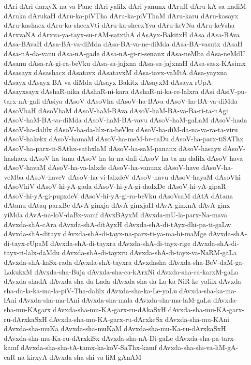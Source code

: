 {dAri
dAri-darxyX-na-va-Pane
dAri-yalilx
dAri-yanunx
dAruH
dAru-kA-sa-nadiM
dAruka
dArukaH
dAru-ka-piVTha
dAru-ka-piVThaM
dAru-karu
dAru-kasayx
dAru-kashacx
dAru-ka-shecxVti
dAru-ka-shecxYva
dAru-keVNa
dAru-keVsha
dArxvaNA
dArxva-ya-tayx-su-rAM-satxthA
dAsAyx-BakitxH
dAsa
dAsa-BAva
dAsa-BAvaH
dAsa-BA-va-diMda
dAsa-BA-va-ne-diMda
dAsa-BA-vasutx
dAsaH
dAsa-nA-da-vanu
dAsa-nA-gade
dAsa-nA-gi-ri-senanx
dAsa-neMba
dAsa-neMdU
dAsanu
dAsa-rA-gi-ra-beVku
dAsa-sa-jajxna
dAsa-sa-jajxnaH
dAsa-sasx-KAsimx
dAsasayx
dAsashacx
dAsatavx
dAsatavxM
dAsa-tavx-vaMtA
dAsa-yayxna
dAsayx
dAsayx-BA-va-diMda
dAsayx-Bakitx
dAsayxM
dAsayx-rUpA
dAsayxsayx
dAshaR-nika
dAshaR-ni-kara
dAshaR-ni-ka-re-lalxra
dAsi
dAsiV-pu-tarx-nA-gali
dAsiya
dAsoV
dAsoVha
dAsoV-ha-BAva
dAsoV-ha-BA-va-diMda
dAsoVhaH
dAsoVhaM
dAsoV-haM-BAva
dAsoV-haM-BA-va-Ba-ri-ta-nAgi
dAsoV-haM-BA-va-diMda
dAsoV-haM-BA-vavu
dAsoV-haM-gaLaM
dAsoV-hada
dAsoV-ha-dalilx
dAsoV-ha-da-lilx-ra-beVku
dAsoV-ha-diM-da-na-va-ra-ta-viru
dAsoV-hakekx
dAsoV-hamaM
dAsoV-ha-meM-be-raDu
dAsoV-ha-parx-tiSAThx
dAsoV-ha-parx-ti-SAthx-sathxlaM
dAsoV-ha-saM-pananx
dAsoV-hasayx
dAsoV-hashacx
dAsoV-ha-tana
dAsoV-ha-ta-na-dali
dAsoV-ha-ta-na-dalilx
dAsoV-hava
dAsoV-havaM
dAsoV-ha-va-lalxde
dAsoV-ha-vanunx
dAsoV-have
dAsoV-ha-veMba
dAsoV-haveV
dAsoV-ha-vi-lalxdeV
dAsoV-havu
dAsoV-hayaM
dAsoVhi
dAsoVhiV
dAsoV-hi-yA-gada
dAsoV-hi-yA-gi-dadxDe
dAsoV-hi-yA-gipaR
dAsoV-hi-yA-gi-pupxdeV
dAsoV-hi-yA-gi-ra-beVku
dAsoVsaM
dAtA
dAtana
dAtanu
dAtaq-parxBe
dAvA-ginxja
dAvA-ginxjaH
dAvA-ginxnA
dAvA-ginx-yiMda
dAvA-na-loV-daBx-vamf
dAvxBAyxM
dAvxda-mU-la-parx-Na-mava
dAvxda-shA-cAra
dAvxda-shA-ditAyxH
dAvxda-shA-di-tAyx-dhi-pa-ti-gaLw
dAvxda-shA-ditayx
dAvxda-shA-di-tayx-na-parx-ti-ya-ma-hi-maMge
dAvxda-shA-di-tayx-rUpaM
dAvxda-shA-di-tayxra
dAvxda-shA-di-tayx-rige
dAvxda-shA-di-tayx-ri-lalx-daMdu
dAvxda-shA-di-tayxru
dAvxda-shA-di-tayx-va-NaRM-gaLa
dAvxda-shA-kaSx-rada
dAvxda-shA-tayxra
dAvxdasha
dAvxda-sha-BeV-daM-ga-LakukxM
dAvxda-sha-Buja
dAvxda-sha-ca-kArxNi
dAvxda-sha-ca-karxM-gaLa
dAvxda-shadA
dAvxda-sha-da-Lada
dAvxda-sha-da-La-ka-NiR-ke-yalilx
dAvxda-sha-da-la-ka-ma-la-piV-Tha-dalilx
dAvxda-sha-ka-Le-yoLu
dAvxda-sha-ka-ma-lAni
dAvxda-sha-ma-lAni
dAvxda-sha-mala
dAvxda-sha-ma-laM-gaLa
dAvxda-sha-mu-KAgarx
dAvxda-sha-mu-KA-garx-ru-dAkaSxH
dAvxda-sha-mu-KA-garx-ru-dArxkaSxH
dAvxda-sha-mu-KA-garx-ru-dArxkeSx
dAvxda-sha-mu-KAni
dAvxda-sha-muKa
dAvxda-sha-muKaM
dAvxda-sha-mu-Ka-ru-dArxkaSxH
dAvxda-sha-mu-Ka-ru-dArxkiSx
dAvxda-sha-nA-Di-gaLe
dAvxda-sha-pa-tarx-kamf
dAvxda-sha-sha-tA-tamx-ka-koV-SaThx-kamf
dAvxda-sha-shi-va-liM-gA-caR-na-kirxyA
dAvxda-sha-shi-va-liM-gAnAM
}
